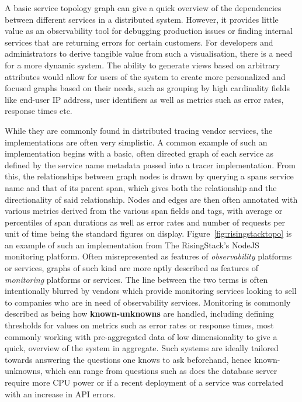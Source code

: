\documentclass[12pt,pdftex,titlepage]{report}
\begin{document}
            A basic service topology graph can give a quick overview of the dependencies between different services in a distributed system. However, it provides little value as an observability tool
            for debugging production issues or finding internal services that are returning errors for certain customers. For developers and administrators to derive tangible value from such a 
            visualisation, there is a need for a more dynamic system. The ability to generate views based on arbitrary attributes would allow for users of the system to create more personalized and 
            focused graphs based on their needs, such as grouping by high cardinality fields like end-user IP address, user identifiers as well as metrics such as error rates, response times 
            etc\cite{doingitwrongtopo}.

            While they are commonly found in distributed tracing vendor services, the implementations are often very simplistic. A common example of such an implementation begins with a basic, often directed
            graph of each service as defined by the service name metadata passed into a tracer implementation. From this, the relationships between graph nodes is drawn by querying a spans service name
            and that of its parent span, which gives both the relationship and the directionality of said relationship. Nodes and edges are then often annotated with various metrics derived from the various
            span fields and tags, with average or percentiles of span durations as well as error rates and number of requests per unit of time being the standard figures on display. Figure~\ref{fig:risingstacktopo}
            is an example of such an implementation from The RisingStack's NodeJS monitoring platform. Often misrepresented as features of \textit{observability} platforms or services, graphs of such kind are
            more aptly described as features of \textit{monitoring} platforms or services. The line between the two terms is often intentionally blurred by vendors which provide monitoring services looking to sell
            to companies who are in need of observability services. Monitoring is commonly described as being how \textbf{known-unknowns} are handled, including defining thresholds for values on metrics such as
            error rates or response times, most commonly working with pre-aggregated data of low dimensionality to give a quick, overview of the system in aggregate. Such systems are ideally tailored towards 
            answering the questions one knows to ask beforehand, hence known-unknowns, which can range from questions such as does the database server require more CPU power or if a recent deployment of a service
            was correlated with an increase in API errors. 
\end{document}
